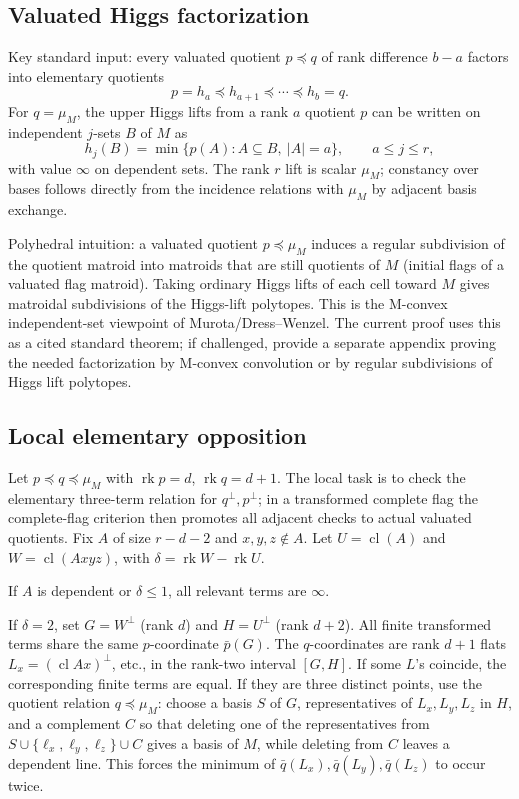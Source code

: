 \documentclass[12pt]{article}
\newcommand{\rk}{\operatorname{rk}}
\newcommand{\cl}{\operatorname{cl}}
\begin{document}
\subsection*{Valuated Higgs factorization}

Key standard input: every valuated quotient $p\preceq q$ of rank
difference $b-a$ factors into elementary quotients
\[
p=h_a\preceq h_{a+1}\preceq\cdots\preceq h_b=q.
\]
For $q=\mu_M$, the upper Higgs lifts from a rank $a$ quotient $p$ can
be written on independent $j$-sets $B$ of $M$ as
\[
h_j(B)=\min\{p(A):A\subseteq B,\ |A|=a\},\qquad a\le j\le r,
\]
with value $\infty$ on dependent sets.  The rank $r$ lift is scalar
$\mu_M$; constancy over bases follows directly from the incidence
relations with $\mu_M$ by adjacent basis exchange.

Polyhedral intuition: a valuated quotient $p\preceq\mu_M$ induces a
regular subdivision of the quotient matroid into matroids that are
still quotients of $M$ (initial flags of a valuated flag matroid).
Taking ordinary Higgs lifts of each cell toward $M$ gives matroidal
subdivisions of the Higgs-lift polytopes.  This is the M-convex
independent-set viewpoint of Murota/Dress--Wenzel.  The current proof
uses this as a cited standard theorem; if challenged, provide a
separate appendix proving the needed factorization by M-convex
convolution or by regular subdivisions of Higgs lift polytopes.

\subsection*{Local elementary opposition}

Let $p\preceq q\preceq\mu_M$ with $\rk p=d$, $\rk q=d+1$.  The local task is to check the elementary three-term
relation for $q^\perp,p^\perp$; in a transformed complete flag the complete-flag criterion then promotes all adjacent checks to actual valuated quotients.  Fix $A$ of size $r-d-2$ and
$x,y,z\notin A$.  Let $U=\cl(A)$ and $W=\cl(Axyz)$, with
$\delta=\rk W-\rk U$.

If $A$ is dependent or $\delta\le1$, all relevant terms are $\infty$.

If $\delta=2$, set $G=W^\perp$ (rank $d$) and $H=U^\perp$ (rank
$d+2$).  All finite transformed terms share the same $p$-coordinate
$\bar p(G)$.  The $q$-coordinates are rank $d+1$ flats
$L_x=(\cl Ax)^\perp$, etc., in the rank-two interval $[G,H]$.  If
some $L$'s coincide, the corresponding finite terms are equal.  If
they are three distinct points, use the quotient relation
$q\preceq\mu_M$: choose a basis $S$ of $G$, representatives of
$L_x,L_y,L_z$ in $H$, and a complement $C$ so that deleting one of
the representatives from $S\cup\{\ell_x,\ell_y,\ell_z\}\cup C$ gives
a basis of $M$, while deleting from $C$ leaves a dependent line.  This
forces the minimum of $\bar q(L_x),\bar q(L_y),\bar q(L_z)$ to occur
twice.
\end{document}
